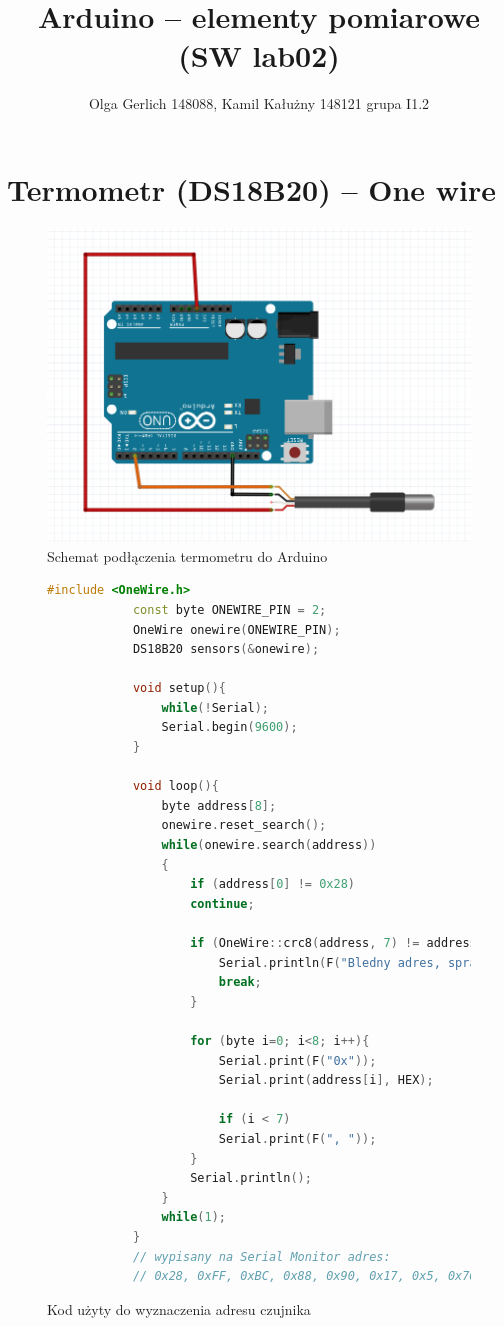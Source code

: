 \documentclass[polish,a4paper]{article}
\title{Arduino – elementy pomiarowe (SW lab02)}
\author{Olga Gerlich 148088, Kamil Kałużny 148121 grupa I1.2}
\begin{document}
	\maketitle
	\section{Termometr (DS18B20) – One wire}
	\begin{figure}[h!]
		\begin{center}
			\includegraphics[scale=0.42]{01_temp_sensor.png}
			\caption*{Schemat podłączenia termometru do Arduino}
		\end{center}
	\end{figure}
	\begin{figure}[h!]
		\begin{lstlisting}[language=C++, basicstyle=\tiny]
			#include <OneWire.h>
			const byte ONEWIRE_PIN = 2;
			OneWire onewire(ONEWIRE_PIN);
			DS18B20 sensors(&onewire);
			
			void setup(){
				while(!Serial);
				Serial.begin(9600);
			}
			
			void loop(){
				byte address[8];
				onewire.reset_search();
				while(onewire.search(address))
				{
					if (address[0] != 0x28)
					continue;
					
					if (OneWire::crc8(address, 7) != address[7]){
						Serial.println(F("Bledny adres, sprawdz polaczenia"));
						break;
					}
					
					for (byte i=0; i<8; i++){
						Serial.print(F("0x"));
						Serial.print(address[i], HEX);
						
						if (i < 7)
						Serial.print(F(", "));
					}
					Serial.println();
				}
				while(1);
			}
			// wypisany na Serial Monitor adres:
			// 0x28, 0xFF, 0xBC, 0x88, 0x90, 0x17, 0x5, 0x76
		\end{lstlisting}
		\caption*{Kod użyty do wyznaczenia adresu czujnika}
	\end{figure}
	
\end{document}
